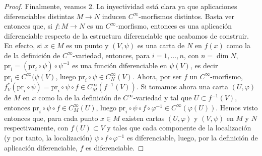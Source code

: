 \documentclass[12pt,a4paper]{book}
\theoremstyle{definition} \newtheorem{defn}[thm]{Definición}
\theoremstyle{definition} \newtheorem{ejemplo}[thm]{Ejemplo}
\theoremstyle{definition} \newtheorem{ejercicio}[thm]{Ejercicio}
\theoremstyle{remark} \newtheorem*{obs}{Observación}
\def\pr{\mathrm{pr}}
\begin{document}
\begin{proof}
		      Finalmente, veamos 2. La inyectividad está clara ya que aplicaciones diferenciables distintas $M\rightarrow N$ inducen $C^{\infty}$-morfismos distintos. Basta ver entonces que, si $f:M\rightarrow N$ es un $C^{\infty}$-morfismo, entonces es una aplicación diferenciable respecto de la estructura diferenciable que acabamos de construir.		      En efecto, si $x\in M$ es un punto y $(V,\psi)$ es una carta de $N$ en $f(x)$ como la de la definición de $C^{\infty}$-variedad, entonces, para $i=1,\dots,n$, con $n=\dim N$, $\pr_i=(\pr_i\circ \psi)\circ \psi^{-1}$ es una función diferenciable en $\psi(V)$, es decir $\pr_i \in C^\infty(\psi(V)$, luego $\pr_i \circ \psi \in C^\infty_N (V)$. Ahora, por ser $f$ un $C^\infty$-morfismo, $f^*_V(\pr_i \circ \psi)=\pr_i \circ \psi \circ f \in C^\infty_M(f^{-1}(V))$. Si tomamos ahora una carta $(U,\varphi)$ de $M$ en $x$ como la de la definición de $C^\infty$-variedad y tal que $U \subset f^{-1}(V)$, entonces $\pr_i \circ \psi \circ f \in C^\infty_M(U)$, luego $\pr_i \circ \psi \circ f \circ \varphi^{-1} \in C^\infty (\varphi(U))$. Hemos visto entonces que, para cada punto $x\in M$ existen cartas $(U,\varphi)$ y $(V,\psi)$ en $M$ y $N$ respectivamente, con $f(U)\subset V$ y tales que cada componente de la localización (y por tanto, la localización) $\psi \circ f \circ \varphi^{-1}$ es diferenciable, luego, por la definición de aplicación diferenciable, $f$ es diferenciable.  
	  \end{proof}
\end{document}
